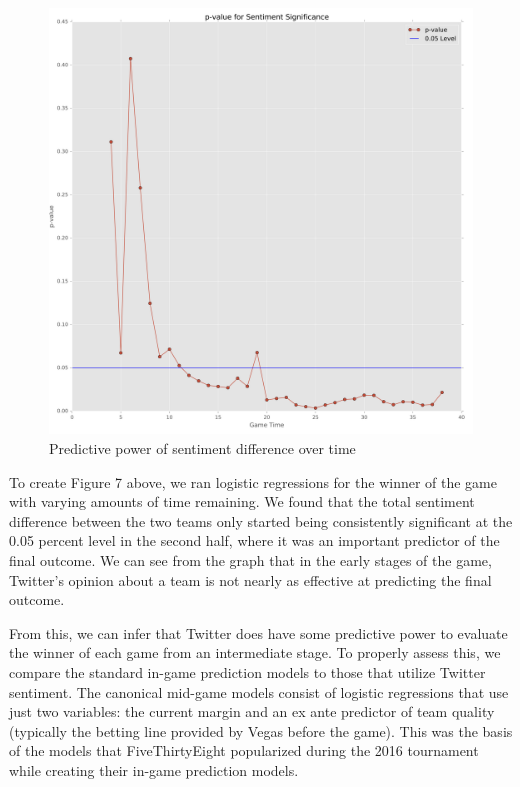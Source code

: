 \documentclass[12pt]{article}
\begin{document}
\begin{doublespacing}
\begin{figure} [H]
	\centering
	\includegraphics[scale = 0.4] {Images/pValuePlot.png} 
	\caption{Predictive power of sentiment difference over time}
\end{figure}

To create Figure 7 above, we ran logistic regressions for the winner of the game with varying amounts of time remaining. We found that the total sentiment difference between the two teams only started being consistently significant at the 0.05 percent level in the second half, where it was an important predictor of the final outcome. We can see from the graph that in the early stages of the game, Twitter's opinion about a team is not nearly as effective at predicting the final outcome. 

From this, we can infer that Twitter does have some predictive power to evaluate the winner of each game from an intermediate stage. To properly assess this, we compare the standard in-game prediction models to those that utilize Twitter sentiment. The canonical mid-game models consist of logistic regressions that use just two variables: the current margin and an ex ante predictor of team quality (typically the betting line provided by Vegas before the game). This was the basis of the models that FiveThirtyEight popularized during the 2016 tournament while creating their in-game prediction models. 


\end{doublespacing}
\end{document}
